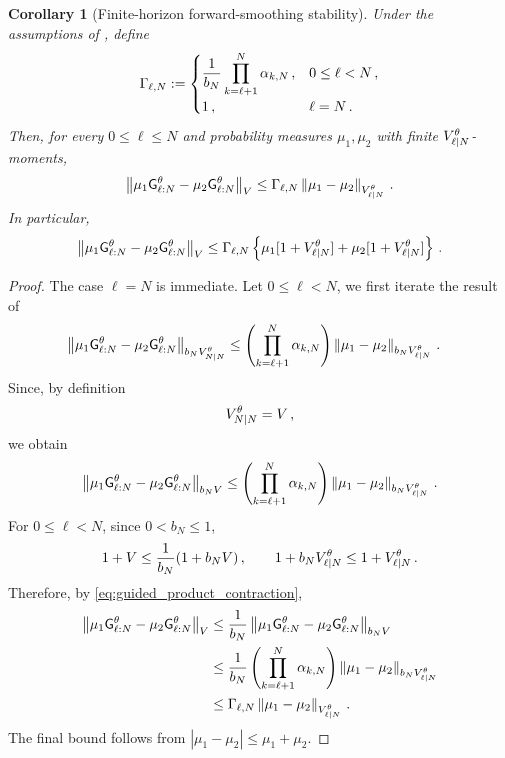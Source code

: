 \documentclass[11pt]{article}
\theoremstyle{plain}
\newtheorem{corollary}[theorem]{Corollary}
\theoremstyle{definition}
\theoremstyle{remark}
\begin{document}
\begin{corollary}[Finite-horizon forward-smoothing stability]
\label{cor:finite_horizon_forward_smoothing_stability}
Under the assumptions of , define
\begin{equation}
\label{eq:def:_gamma_ell}
\Gamma_{\ell,N} :=
\begin{cases}
\displaystyle \frac1{b_N} \prod_{k=\ell+1}^{N}\alpha_{k,N} \,, & 0\le\ell<N \,, \\[2mm]
1 \,, & \ell=N \,.
\end{cases}
\end{equation}
Then, for every $0\le\ell\le N$ and probability measures $\mu_1,\mu_2$ with finite $\twistedlyap{\ell}{N}[\theta]$-moments,
\begin{equation}
\label{eq:finite_horizon_forward_smoothing}
\vnorm[ \mu_1\prodfsmk{\ell}{N}[\theta] - \mu_2\prodfsmk{\ell}{N}[\theta] ][V]
\le \Gamma_{\ell,N} \vnorm[ \mu_1-\mu_2 ][\twistedlyap{\ell}{N}[\theta]] \eqsp. 
\end{equation}
In particular,
$$
\vnorm[ \mu_1\prodfsmk{\ell}{N}[\theta] - \mu_2\prodfsmk{\ell}{N}[\theta] ][V] \le \Gamma_{\ell,N} \left\{ \mu_1[1+\twistedlyap{\ell}{N}[\theta]] + \mu_2[1+\twistedlyap{\ell}{N}[\theta]] \right\} \eqsp.
$$
\end{corollary}


\begin{proof}
The case $\ell=N$ is immediate. Let $0\le\ell<N$, we first iterate the result of  
\begin{align*}
&\vnorm[ \mu_1\prodfsmk{\ell}{N}[\theta] - \mu_2\prodfsmk{\ell}{N}[\theta] ][b_N\twistedlyap{N}{N}[\theta]] \le \left( \prod_{k=\ell+1}^{N}\alpha_{k,N} \right) \vnorm[ \mu_1-\mu_2 ][b_N\twistedlyap{\ell}{N}[\theta]] \eqsp.
\end{align*}
Since, by definition
$$
\twistedlyap{N}{N}[\theta]=V \eqsp,
$$
we obtain
\begin{equation}
\label{eq:guided_product_contraction}
\vnorm[ \mu_1\prodfsmk{\ell}{N}[\theta] - \mu_2\prodfsmk{\ell}{N}[\theta] ][b_NV] \le \left( \prod_{k=\ell+1}^{N}\alpha_{k,N} \right) \vnorm[ \mu_1-\mu_2 ][b_N\twistedlyap{\ell}{N}[\theta]] \eqsp.
\end{equation}
%
For $0\le\ell<N$, since $0<b_N\le1$,
$$
1+V\le\frac1{b_N}(1+b_NV) \eqsp, \qquad
1+b_N\twistedlyap{\ell}{N}[\theta] \le 1+\twistedlyap{\ell}{N}[\theta] \eqsp.
$$
Therefore, by \eqref{eq:guided_product_contraction},
\begin{align*}
\vnorm[ \mu_1\prodfsmk{\ell}{N}[\theta] - \mu_2\prodfsmk{\ell}{N}[\theta] ][V] 
& \le \frac1{b_N} \vnorm[ \mu_1\prodfsmk{\ell}{N}[\theta] - \mu_2\prodfsmk{\ell}{N}[\theta]][b_NV] \\
& \le \frac1{b_N} \left( \prod_{k=\ell+1}^{N}\alpha_{k,N} \right) \vnorm[ \mu_1-\mu_2 ][b_N\twistedlyap{\ell}{N}[\theta]]\\
& \le \Gamma_{\ell,N} \vnorm[ \mu_1-\mu_2 ][\twistedlyap{\ell}{N}[\theta]] \eqsp.
\end{align*}
The final bound follows from
$|\mu_1-\mu_2|\le\mu_1+\mu_2$.
\end{proof}
\end{document}
